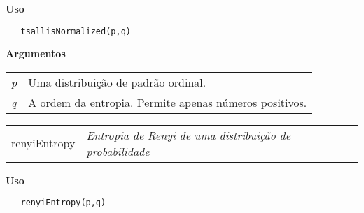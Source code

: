 \textbf{Uso}

\begin{lstlisting}
   tsallisNormalized(p,q)
\end{lstlisting}

\vspace{0.5cm}

\textbf{Argumentos}

\begin{table}[!ht]
\begin{center}
\begin{tabularx}{\textwidth}{X X}
\hspace{0.5cm} \textit{p} \vspace{0.5cm}& Uma distribuição de padrão ordinal.\vspace{0.5cm}\\
\hspace{0.5cm} \textit{q} \vspace{0.5cm}&  A ordem da entropia. Permite apenas números positivos.\vspace{0.5cm}\\
\end{tabularx}
\end{center}
\end{table} 


\hrulefill   

\begin{table}[!ht]
\begin{center}
\begin{tabularx}{\textwidth}{ X X}
\hspace{0.5cm} renyiEntropy & \textit{Entropia de Renyi de uma distribuição de probabilidade}\\
\end{tabularx}
\end{center}
\end{table} 

\vspace{-0.5cm}

\hrulefill  

\vspace{0.5cm}

\textbf{Uso}

\begin{lstlisting}
   renyiEntropy(p,q)
\end{lstlisting}

\vspace{0.5cm}

